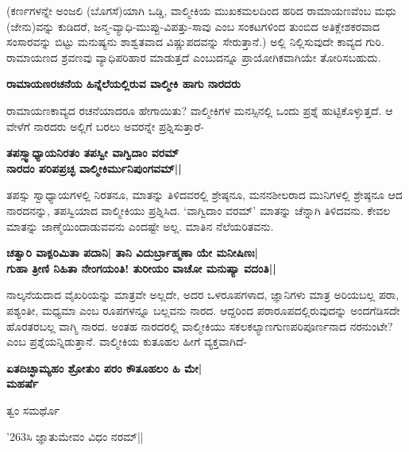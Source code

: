 (ಕರ್ಣಗಳನ್ನೇ ಅಂಜಲಿ (ಬೊಗಸೆ)ಯಾಗಿ ಒಡ್ಡಿ, ವಾಲ್ಮೀಕಿಯ ಮುಖಕಮಲದಿಂದ ಹರಿದ ರಾಮಾಯಣವೆಂಬ ಮಧು (ಜೇನು)ವನ್ನು ಕುಡಿದರೆ, ಜನ್ಮ-ವ್ಯಾಧಿ-ಮುಪ್ಪು-ವಿಪತ್ತು-ಸಾವು ಎಂಬ ಸಂಕಟಗಳಿಂದ ತುಂಬಿದ ಅತಿಕ್ಲೇಶಕರವಾದ ಸಂಸಾರವನ್ನು ಬಿಟ್ಟು ಮನುಷ್ಯನು ಶಾಶ್ವತವಾದ ವಿಷ್ಣುಪದವನ್ನು ಸೇರುತ್ತಾನೆ.) ಅಲ್ಲಿ ನಿಲ್ಲಿಸುವುದೇ ಕಾವ್ಯದ ಗುರಿ. ರಾಮಾಯಣದ ಶ್ರವಣವು ವ್ಯಾಧಿಪರಿಹಾರ ಮಾಡುತ್ತದೆ ಎಂಬುದನ್ನೂ ಪ್ರಾಯೋಗಿಕವಾಗಿಯೇ ತೋರಿಸಬಹುದು. 


{\bf ರಾಮಾಯಣರಚನೆಯ ಹಿನ್ನೆಲೆಯಲ್ಲಿರುವ ವಾಲ್ಮೀಕಿ ಹಾಗು ನಾರದರು} 


ರಾಮಾಯಣಕಾವ್ಯದ ರಚನೆಯಾದರೂ ಹೇಗಾಯಿತು? ವಾಲ್ಮೀಕಿಗಳ ಮನಸ್ಸಿನಲ್ಲಿ ಒಂದು ಪ್ರಶ್ನೆ ಹುಟ್ಟಿಕೊಳ್ಳುತ್ತದೆ. ಆ ವೇಳೆಗೆ ನಾರದರು ಅಲ್ಲಿಗೆ ಬರಲು ಅವರನ್ನೇ ಪ್ರಶ್ನಿಸುತ್ತಾರೆ- 


\begin{center} 

{\bf ತಪಸ್ಸ್ವಾಧ್ಯಾಯನಿರತಂ ತಪಸ್ವೀ ವಾಗ್ವಿದಾಂ ವರಮ್‍\\ 

ನಾರದಂ ಪರಿಪಪ್ರಚ್ಛ ವಾಲ್ಮೀಕಿರ್ಮುನಿಪುಂಗವಮ್‍||} 

\end{center} 


ತಪಸ್ಸು ಸ್ವಾಧ್ಯಾಯಗಳಲ್ಲಿ ನಿರತನೂ, ಮಾತನ್ನು ತಿಳಿದವರಲ್ಲಿ ಶ್ರೇಷ್ಠನೂ, ಮನನಶೀಲರಾದ ಮುನಿಗಳಲ್ಲಿ ಶ್ರೇಷ್ಠನೂ ಆದ ನಾರದನನ್ನು, ತಪಸ್ವಿಯಾದ ವಾಲ್ಮೀಕಿಯು ಪ್ರಶ್ನಿಸಿದ. `ವಾಗ್ವಿದಾಂ ವರಮ್‍' ಮಾತನ್ನು ಚೆನ್ನಾಗಿ ತಿಳಿದವನು. ಕೇವಲ ಮಾತನ್ನು ಜಾಣ್ಮೆಯಿಂದಾಡುವವನು ಎಂದಷ್ಟೇ ಅಲ್ಲ. ಮಾತಿನ ನೆಲೆಯರಿತವನು. 


\begin{center} 

{\bf ಚತ್ವಾರಿ ವಾಕ್ಪರಿಮಿತಾ ಪದಾನಿ| ತಾನಿ ವಿದುರ್ಬ್ರಾಹ್ಮಣಾ ಯೇ ಮನೀಷಿಣಃ|\\ 

ಗುಹಾ ತ್ರೀಣಿ ನಿಹಿತಾ ನೇಂಗಯಂತಿ! ತುರೀಯಂ ವಾಚೋ ಮನುಷ್ಯಾ ವದಂತಿ||} 

\end{center} 


ನಾಲ್ಕನೆಯದಾದ ವೈಖರಿಯನ್ನು ಮಾತ್ರವೇ ಅಲ್ಲದೇ, ಅದರ ಒಳರೂಪಗಳಾದ, ಜ್ಞಾನಿಗಳು ಮಾತ್ರ ಅರಿಯಬಲ್ಲ ಪರಾ, ಪಶ್ಯಂತೀ, ಮಧ್ಯಮಾ ಎಂಬ ರೂಪಗಳನ್ನೂ ಬಲ್ಲವನು ನಾರದ. ಆದ್ದರಿಂದ ಪರಾರೂಪದಲ್ಲಿರುವುದನ್ನು ಅಂದಗೆಡಿಸದೇ ಹೊರತರಬಲ್ಲ ವಾಗ್ಮಿ ನಾರದ. ಅಂತಹ ನಾರದರಲ್ಲಿ ವಾಲ್ಮೀಕಿಯು ಸಕಲಕಲ್ಯಾಣಗುಣಪರಿಪೂರ್ಣನಾದ ನರನುಂಟೇ? ಎಂಬ ಪ್ರಶ್ನೆಯನ್ನಿಡುತ್ತಾನೆ. ವಾಲ್ಮೀಕಿಯ ಕುತೂಹಲ ಹೀಗೆ ವ್ಯಕ್ತವಾಗಿದೆ- 


\begin{center} 

{\bf ಏತದಿಚ್ಛಾಮ್ಯಹಂ ಶ್ರೋತುಂ ಪರಂ ಕೌತೂಹಲಂ ಹಿ ಮೇ|\\ 

ಮಹರ್ಷೆ

ತ್ವಂ ಸಮರ್ಥೊ

\char'263ಸಿ ಜ್ಞಾತುಮೇವಂ ವಿಧಂ ನರಮ್‍||} 

\end{center} 


